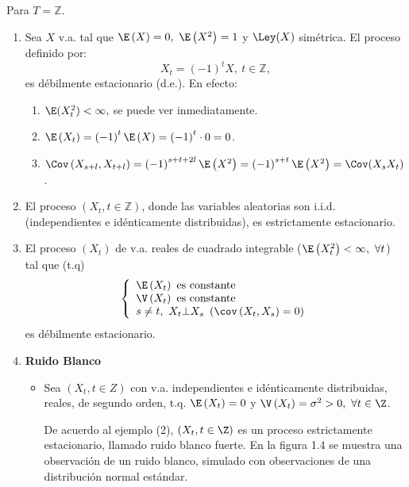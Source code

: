 \begin{ejemplo}
 Para $T=\mathbb{Z}$.

\begin{enumerate}
\item Sea $X$ v.a. tal que $\E\left( X \right)=0,\ \E\left( X^{2} \right)=1$ y $\Ley(X)$ sim\'{e}trica. El proceso definido por:
\[
X_{t}={(-1)}^{t}X,\ t\in \mathbb{Z},
\]
es d\'{e}bilmente estacionario (d.e.). En efecto:
\begin{enumerate}
\item $\E(X_{t}^{2})<\infty ,$ se puede ver inmediatamente.
\item $\E\left( X_{t} \right)=\left( -1 \right)^{t}\E\left( X \right)=\left( -1 \right)^{t}\cdot 0=0$.
\item $\Cov\left( X_{s+l},X_{t+l} \right)=\left( -1 \right)^{s+t+2l}\E\left( X^{2} \right)=\left( -1 \right)^{s+t}\E\left( X^{2} \right)=\Cov(X_{s}X_{t})$.
\end{enumerate}

\item El proceso $(X_{t}, t\in \mathbb{Z})$, donde las variables aleatorias son i.i.d. (independientes e id\'{e}nticamente distribuidas), es estrictamente estacionario.


\item El proceso $(X_{t})$ de v.a. reales de cuadrado integrable ($\E\left( X_{t}^{2} \right)<\infty,\ \forall t$) tal que (t.q)
\[
\left\{ {\begin{array}{l}
 \E\left( X_{t} \right)\text{ es constante} \\ 
 \V\left( X_{t} \right)\text{ es constante} \\ 
 s\neq t,\ X_{t}\bot X_{s}\ \left(\cov\left( X_{t},X_{s} \right)=0 \right) \\ 
 \end{array}} \right.
\]
es d\'{e}bilmente estacionario.

\item \textbf{Ruido Blanco}
	\begin{itemize}
	\item Sea $(X_{t}, t\in Z)$ con v.a. independientes e id\'{e}nticamente distribuidas, reales, de segundo orden, t.q. $\E\left( X_{t} \right)=0$ y $\V\left( X_{t} \right)=\sigma^{2}>0,\ \forall t\in \Z$. 

De acuerdo al ejemplo (2), $(X_{t}, t\in \Z)$ es un proceso estrictamente estacionario, llamado ruido blanco fuerte. En la figura 1.4 se muestra una observaci\'{o}n de un ruido blanco, simulado con observaciones de una distribuci\'{o}n normal est\'{a}ndar.


\end{itemize}
\end{enumerate}
\end{ejemplo}
